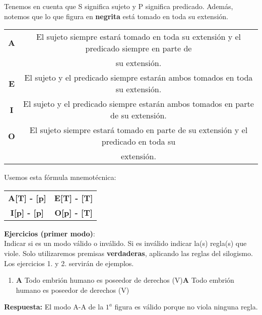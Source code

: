 \documentclass{article}
\begin{document}
Tenemos en cuenta que S significa sujeto y P significa predicado. Además, notemos que lo que figura en \textbf{negrita} está tomado en toda su extensión.
\begin{center}
\begin{tabular}{|c|c|}
    \hline
     \textbf{A} & El sujeto siempre estará tomado en toda su extensión y el predicado siempre en parte de \\ & su extensión.  \\
     \hline
     \textbf{E} & El sujeto y el predicado siempre estarán ambos tomados en toda su extensión. \\
     \hline
     \textbf{I} & El sujeto y el predicado siempre estarán ambos tomados en parte de su extensión. \\
     \hline
     \textbf{O} & El sujeto siempre estará tomado en parte de su extensión y el predicado en toda su \\ & extensión. \\
     \hline
\end{tabular}
\end{center}

Usemos esta fórmula mnemotécnica:

\begin{center}
\begin{tabular}{c c}
     \textbf{A[T] - [p]              } & \textbf{E[T] - [T]} \\
     \textbf{ I[p] - [p]             } & \textbf{O[p] - [T]} \\
\end{tabular}
\end{center}

\textbf{Ejercicios (primer modo)}: \\
Indicar si es un modo válido o inválido. Si es inválido indicar la(s) regla(s) que viole. Solo utilizaremos premisas \textbf{verdaderas}, aplicando las reglas del silogismo. \\
Los ejercicios 1. y 2. servirán de ejemplos.

\begin{enumerate}
    \item {}
    {\textbf{A} Todo embrión humano es poseedor de derechos (V)}{\textbf{A} Todo embrión humano es poseedor de derechos (V)}
    \end{enumerate}

\textbf{Respuesta:} El modo A-A de la $1^a$ figura es válido porque no viola ninguna regla.
\end{document}
